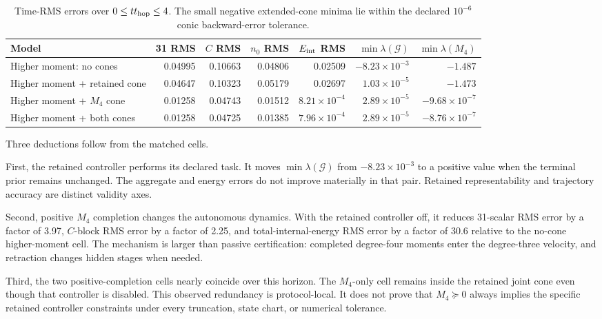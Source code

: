 \documentclass[10pt,letterpaper,twocolumn]{article}
\begin{document}
\begin{table}[t]
\centering
\small
\setlength{\tabcolsep}{4pt}
\begin{tabular}{@{}lrrrrrr@{}}
\toprule
Model & 31 RMS & \(C\) RMS & \(n_0\) RMS & \(E_{\rm int}\) RMS
& \(\min\lambda(\mathcal G)\) & \(\min\lambda(M_4)\)\\
\midrule
Higher moment: no cones
& 0.04995 & 0.10663 & 0.04806 & 0.02509
& \(-8.23\times10^{-3}\) & \(-1.487\)\\
Higher moment + retained cone
& 0.04647 & 0.10323 & 0.05179 & 0.02697
& \(1.03\times10^{-5}\) & \(-1.473\)\\
Higher moment + \(M_4\) cone
& 0.01258 & 0.04743 & 0.01512 & \(8.21\times10^{-4}\)
& \(2.89\times10^{-5}\) & \(-9.68\times10^{-7}\)\\
Higher moment + both cones
& 0.01258 & 0.04725 & 0.01385 & \(7.96\times10^{-4}\)
& \(2.89\times10^{-5}\) & \(-8.76\times10^{-7}\)\\
\bottomrule
\end{tabular}
\caption{Time-RMS errors over \(0\le t t_{\rm hop}\le4\).  The small negative
extended-cone minima lie within the declared \(10^{-6}\) conic backward-error
tolerance.}
\label{tab:m4result}
\end{table}

Three deductions follow from the matched cells.

First, the retained controller performs its declared task.  It moves
\(\min\lambda(\mathcal G)\) from \(-8.23\times10^{-3}\) to a positive value
when the terminal prior remains unchanged.  The aggregate and energy errors do
not improve materially in that pair.  Retained representability and trajectory
accuracy are distinct validity axes.

Second, positive $M_4$ completion changes the autonomous dynamics.  With the
retained controller off, it reduces 31-scalar RMS error by a factor of 3.97,
\(C\)-block RMS error by a factor of 2.25, and total-internal-energy RMS error
by a factor of 30.6 relative to the no-cone higher-moment cell.  The mechanism
is larger than passive certification: completed degree-four moments enter the
degree-three velocity, and retraction changes hidden stages when needed.

Third, the two positive-completion cells nearly coincide over this horizon.
The $M_4$-only cell remains inside the retained joint cone even though that
controller is disabled.  This observed redundancy is protocol-local.  It does
not prove that \(M_4\succeq0\) always implies the specific retained controller
constraints under every truncation, state chart, or numerical tolerance.
\end{document}
